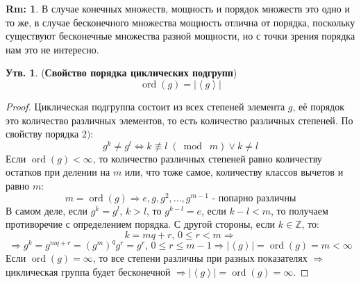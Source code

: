 \documentclass[12pt]{article}
\newcommand{\MZ}{\mathbb{Z}}
\theoremstyle{definition}
\newtheorem{rem}{Rm:}
\newtheorem{prop}{Утв.}
\newcommand{\linsp}[1]{\left\langle #1 \right\rangle }
\DeclareMathOperator\ord{ord}
\newcommand{\nmodn}[3]{#1 \not\equiv #2 \; (\bmod \; #3)}
\begin{document}
\begin{rem}
	В случае конечных множеств, мощность и порядок множеств это одно и то же, в случае бесконечного множества мощность отлична от порядка, поскольку существуют бесконечные множества разной мощности, но с точки зрения порядка нам это не интересно.
\end{rem}
\begin{prop}(\textbf{Свойство порядка циклических подгрупп})
	$$
		\ord(g) = |\linsp{g}|
	$$
\end{prop}
\begin{proof}
	Циклическая подгруппа состоит из всех степеней элемента $g$, её порядок это количество различных элементов, то есть количество различных степеней. По свойству порядка $2)$:
	$$
		g^k \neq g^l \Leftrightarrow \nmodn{k}{l}{m}\vee k \neq l
 	$$
 	Если $\ord(g) < \infty$, то количество различных степеней равно количеству остатков при делении на $m$ или, что тоже самое, количеству классов вычетов и равно $m$: 
 	$$
 		m = \ord(g) \Rightarrow e,g,g^2, \dotsc, g^{m-1} \text{ - попарно различны}
 	$$
 	В самом деле, если $g^k = g^l, \, k > l$, то $g^{k - l} = e$, если $k -l< m$, то получаем противоречие с определением порядка. С другой стороны, если $k \in \MZ$, то: 
 	$$
 		k = mq + r, \, 0 \leq r < m \Rightarrow 
 	$$
 	$$
 		\Rightarrow g^{k} = g^{mq + r} = (g^m)^qg^r = g^r, \, 0 \leq r \leq m-1 \Rightarrow |\linsp{g}| = \ord(g) = m < \infty
 	$$
 	Если $\ord(g) = \infty$, то все степени различны при разных показателях $\Rightarrow$ циклическая группа будет бесконечной $\Rightarrow |\linsp{g}| = \ord(g) = \infty$.
\end{proof}
\end{document}
